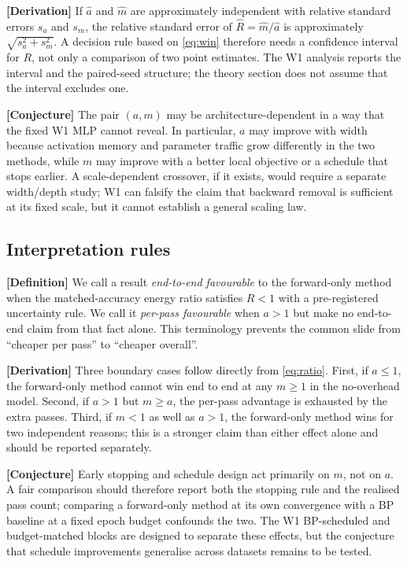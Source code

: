 \textbf{[Derivation]} If $\hat a$ and $\hat m$ are approximately independent
with relative standard errors $s_a$ and $s_m$, the relative standard error of
$\hat R=\hat m/\hat a$ is approximately
$\sqrt{s_a^2+s_m^2}$.  A decision rule based on \eqref{eq:win} therefore needs
a confidence interval for $R$, not only a comparison of two point estimates.
The W1 analysis reports the interval and the paired-seed structure; the theory
section does not assume that the interval excludes one.

\textbf{[Conjecture]} The pair $(a,m)$ may be architecture-dependent in a way
that the fixed W1 MLP cannot reveal.  In particular, $a$ may improve with width
because activation memory and parameter traffic grow differently in the two
methods, while $m$ may improve with a better local objective or a schedule that
stops earlier.  A scale-dependent crossover, if it exists, would require a
separate width/depth study; W1 can falsify the claim that backward removal is
sufficient at its fixed scale, but it cannot establish a general scaling law.

\subsection{Interpretation rules}

\textbf{[Definition]} We call a result \emph{end-to-end favourable} to the
forward-only method when the matched-accuracy energy ratio satisfies
$R<1$ with a pre-registered uncertainty rule.  We call it \emph{per-pass
favourable} when $a>1$ but make no end-to-end claim from that fact alone.  This
terminology prevents the common slide from ``cheaper per pass'' to ``cheaper
overall''.

\textbf{[Derivation]} Three boundary cases follow directly from
\eqref{eq:ratio}.  First, if $a\le 1$, the forward-only method cannot win end to
end at any $m\ge 1$ in the no-overhead model.  Second, if $a>1$ but
$m\ge a$, the per-pass advantage is exhausted by the extra passes.  Third, if
$m<1$ as well as $a>1$, the forward-only method wins for two independent
reasons; this is a stronger claim than either effect alone and should be
reported separately.

\textbf{[Conjecture]} Early stopping and schedule design act primarily on $m$,
not on $a$.  A fair comparison should therefore report both the stopping rule
and the realised pass count; comparing a forward-only method at its own
convergence with a BP baseline at a fixed epoch budget confounds the two.
The W1 BP-scheduled and budget-matched blocks are designed to separate these
effects, but the conjecture that schedule improvements generalise across
datasets remains to be tested.

